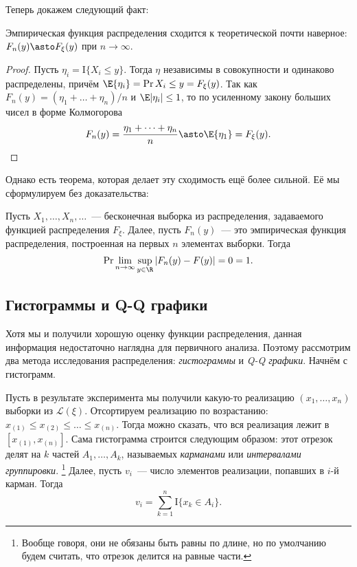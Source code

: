 Теперь докажем следующий факт:
\begin{theorem}
	Эмпирическая функция распределения сходится к теоретической почти наверное: 
	\(F_{n}(y) \asto F_{\xi}(y)\) при \(n \to \infty\).
\end{theorem}
\begin{proof}
	Пусть \(\eta_{i} = \mathrm{I}\{X_{i} \leq y\}\). Тогда \(\eta\) 
	независимы в совокупности и одинаково распределены, причём \(\E{\eta_{i}} = 
	\Pr{X_{i} \leq y} = F_{\xi}(y)\). Так как \(F_{n}(y) = (\eta_{1} + \dots + 
	\eta_{n})/n\) и \(\E|\eta_{i}| \leq 1\), то по усиленному закону больших 
	чисел в форме Колмогорова
	\[
		F_{n}(y) = \frac{\eta_{1} + \dots + \eta_{n}}{n} \asto \E{\eta_{1}} = 
		F_{\xi}(y). \qedhere
	\]
\end{proof}

Однако есть теорема, которая делает эту сходимость ещё более сильной. Её мы 
сформулируем без доказательства:
\begin{theorem}
	Пусть \(X_{1}, \dots, X_{n}, \dots\)~--- бесконечная выборка из 
	распределения, задаваемого функцией распределения \(F_{\xi}\). Далее, пусть 
	\(F_{n}(y)\)~--- это эмпирическая функция распределения, построенная на 
	первых \(n\) элементах выборки. Тогда
	\[
		\Pr{\lim\limits_{n \to \infty}\sup\limits_{y \in \R} |F_{n}(y) - F(y)| 
		= 0} = 1.
	\]
\end{theorem}

\subsection{Гистограммы и Q-Q графики}
Хотя мы и получили хорошую оценку функции распределения, данная информация 
недостаточно наглядна для первичного анализа. Поэтому рассмотрим два метода 
исследования распределения: \emph{гистограммы} и \emph{Q-Q графики}. Начнём с 
гистограмм.

Пусть в результате эксперимента мы получили какую-то реализацию \((x_{1}, 
\dots, x_{n})\) выборки из \(\mathcal{L}(\xi)\). Отсортируем реализацию по 
возрастанию: \(x_{(1)} \leq x_{(2)} \leq \dots \leq x_{(n)}\). Тогда можно 
сказать, что вся реализация лежит в \([x_{(1)}, x_{(n)}]\). Сама гистограмма 
строится следующим образом: этот отрезок делят на \(k\) частей \(A_{1}, \dots, 
A_{k}\), называемых \emph{карманами} или \emph{интервалами группировки}. 
\footnote{Вообще говоря, они не обязаны быть равны по длине, но по умолчанию 
будем считать, что отрезок делится на равные части.} Далее, пусть \(v_{i}\)~--- 
число элементов реализации, попавших в \(i\)-й карман. Тогда
\[
	v_{i} = \sum_{k = 1}^{n} \mathrm{I}\{x_{k} \in A_{i}\}.
\]

